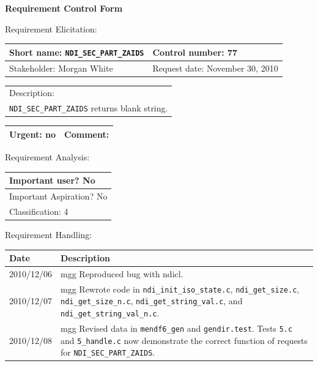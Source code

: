\begin{center}\Large\bf
Requirement Control Form
\end{center}
\vspace{24pt}

Requirement Elicitation:

\begin{tabular}{|p{211pt}|p{211pt}|} \hline
Short name: \texttt{NDI\_SEC\_PART\_ZAIDS} & Control number: 77\\ \hline
Stakeholder: Morgan White & Request date: November 30, 2010\\
\end{tabular}
\begin{tabular}{|p{433pt}|} \hline
Description: \\ 
\texttt{NDI\_SEC\_PART\_ZAIDS} returns blank string.\\ \hline
\end{tabular} 
\begin{tabular}{|p{211pt}|p{211pt}|} \hline
Urgent: no & Comment:
\\ \hline
\end{tabular}

\vspace{24pt}

Requirement Analysis:

\begin{tabular}{|p{433pt}|} \hline
Important user? No \\ \hline
Important Aspiration? No \\ \hline
Classification: 4 \\ \hline
\end{tabular}

\vspace{24pt}

Requirement Handling:

\begin{tabular}{|p{72pt}|p{351pt}|} \hline
Date & Description \\ \hline
2010/12/06 & mgg Reproduced bug with ndicl.\\ \hline
2010/12/07 & mgg Rewrote code in \texttt{ndi\_init\_iso\_state.c},
\texttt{ndi\_get\_size.c}, \texttt{ndi\_get\_size\_n.c},
\texttt{ndi\_get\_string\_val.c}, and
\texttt{ndi\_get\_string\_val\_n.c}.\\ \hline 
2010/12/08 & mgg Revised data in \texttt{mendf6\_gen} and
\texttt{gendir.test}.  Tests \texttt{5.c} and \texttt{5\_handle.c} now
demonstrate the correct function of requests for
\texttt{NDI\_SEC\_PART\_ZAIDS}.\\ \hline
\end{tabular}
